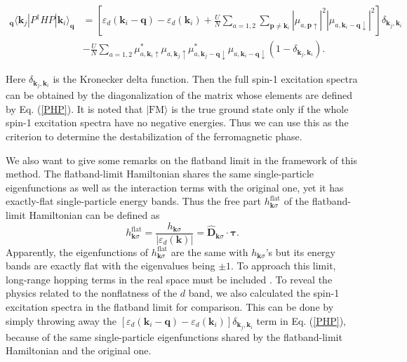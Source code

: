 \documentclass[amsmath,superscriptaddress,showpacs,aps,prb,twocolumn]{revtex4-1}
\begin{document}
\begin{widetext}
\begin{equation}\label{PHP}
\begin{aligned}
_\mathbf{q}\langle\mathbf{k}_j|P^\dagger HP|\mathbf{k}_i\rangle_\mathbf{q}&=\left[\varepsilon_d(\mathbf{k}_i-\mathbf{q})-\varepsilon_d(\mathbf{k}_i)
+\frac{U}{N}\sum_{a=1,2}\sum_{\mathbf{p}\neq\mathbf{k}_i}\left|\mu_{a,\mathbf{p}\uparrow}\right|^2\left|\mu_{a,\mathbf{k}_{i}-\mathbf{q}\downarrow}\right|^2
\right]\delta_{\mathbf{k}_j,\mathbf{k}_i} \\
& -\frac{U}{N}\sum_{a=1,2}
\mu^{\ast}_{a,\mathbf{k}_{i}\uparrow}\mu_{a,\mathbf{k}_{j}\uparrow}\mu^{\ast}_{a,\mathbf{k}_j-\mathbf{q}\downarrow}\mu_{a,\mathbf{k}_i-\mathbf{q}\downarrow}
\left(1-\delta_{\mathbf{k}_j,\mathbf{k}_i}\right).
\end{aligned}
\end{equation}
\end{widetext}
Here $\delta_{\mathbf{k}_j,\mathbf{k}_i}$ is the Kronecker delta function. Then the full spin-1 excitation spectra can be obtained by the diagonalization of the matrix whose elements are defined by Eq. (\ref{PHP}). It is noted that $|\text{FM}\rangle$ is the true ground state only if the whole spin-1 excitation spectra have no negative energies. Thus we can use this as the criterion to determine the destabilization of the ferromagnetic phase.
\par We also want to give some remarks on the flatband limit in the framework of this method. The flatband-limit Hamiltonian shares the same single-particle eigenfunctions as well as the interaction terms with the original one, yet it has exactly-flat single-particle energy bands\cite{NSCM_PRL2011}. Thus the free part $h^\text{flat}_{\mathbf{k}\sigma}$ of the flatband-limit Hamiltonian can be defined as
\begin{equation}
h^{\text{flat}}_{\mathbf{k}\sigma}=\frac{h_{\mathbf{k}\sigma}}{\left|\varepsilon_{d}(\mathbf{k})\right|}={\hat{\mathbf{D}}_{\mathbf{k}\sigma}}\cdot\mathbf{\tau}.
\end{equation}
Apparently, the eigenfunctions of $h^\text{flat}_{\mathbf{k}\sigma}$ are the same with $h_{\mathbf{k}\sigma}$'s but its energy bands are exactly flat with the eigenvalues being $\pm 1$. To approach this limit, long-range hopping terms in the real space must be included \cite{NSCM_PRL2011}. To reveal the physics related to the nonflatness of the $d$ band, we also calculated the spin-1 excitation spectra in the flatband limit for comparison. This can be done by simply throwing away the $\left[\varepsilon_d(\mathbf{k}_i-\mathbf{q})-\varepsilon_d(\mathbf{k}_i)\right]\delta_{\mathbf{k}_j,\mathbf{k}_i}$ term in Eq. (\ref{PHP}), because of the same single-particle eigenfunctions shared by the flatband-limit Hamiltonian and the original one.
\end{document}
